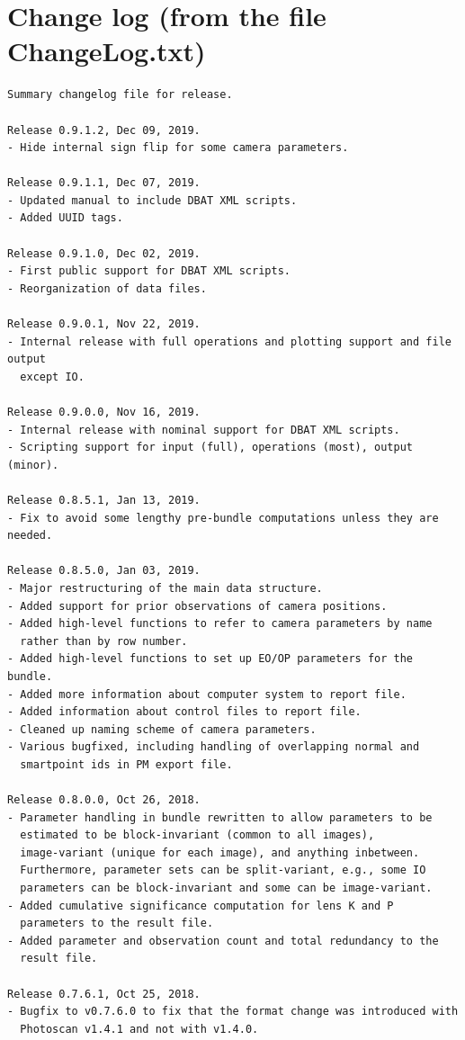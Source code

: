 \documentclass{article}
\begin{document}
\section[Change log]{Change log (from the file ChangeLog.txt)}
\label{sec:changeLog}
\begin{verbatim}
Summary changelog file for release.

Release 0.9.1.2, Dec 09, 2019.
- Hide internal sign flip for some camera parameters.

Release 0.9.1.1, Dec 07, 2019.
- Updated manual to include DBAT XML scripts.
- Added UUID tags.

Release 0.9.1.0, Dec 02, 2019.
- First public support for DBAT XML scripts.
- Reorganization of data files.

Release 0.9.0.1, Nov 22, 2019.
- Internal release with full operations and plotting support and file output
  except IO.

Release 0.9.0.0, Nov 16, 2019.
- Internal release with nominal support for DBAT XML scripts.
- Scripting support for input (full), operations (most), output (minor).

Release 0.8.5.1, Jan 13, 2019.
- Fix to avoid some lengthy pre-bundle computations unless they are needed.

Release 0.8.5.0, Jan 03, 2019.
- Major restructuring of the main data structure.
- Added support for prior observations of camera positions.
- Added high-level functions to refer to camera parameters by name
  rather than by row number.
- Added high-level functions to set up EO/OP parameters for the bundle.
- Added more information about computer system to report file.
- Added information about control files to report file.
- Cleaned up naming scheme of camera parameters.
- Various bugfixed, including handling of overlapping normal and
  smartpoint ids in PM export file.

Release 0.8.0.0, Oct 26, 2018.
- Parameter handling in bundle rewritten to allow parameters to be
  estimated to be block-invariant (common to all images),
  image-variant (unique for each image), and anything inbetween.
  Furthermore, parameter sets can be split-variant, e.g., some IO
  parameters can be block-invariant and some can be image-variant.
- Added cumulative significance computation for lens K and P
  parameters to the result file.
- Added parameter and observation count and total redundancy to the
  result file.

Release 0.7.6.1, Oct 25, 2018.
- Bugfix to v0.7.6.0 to fix that the format change was introduced with
  Photoscan v1.4.1 and not with v1.4.0.


\end{verbatim}
\end{document}

